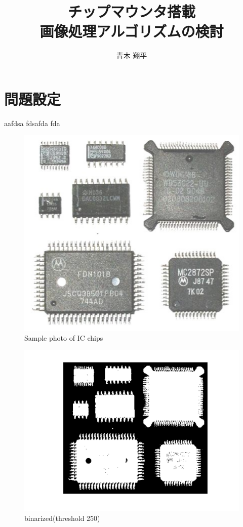 \documentclass[twocolumn,oneside,a4paper]{article}
\title{チップマウンタ搭載 \\画像処理アルゴリズムの検討}
\author{青木 翔平}
\begin{document}
\maketitle

\section{問題設定}
aafdsa
fdsafda
fda

\begin{figure}[htbp]
    \includegraphics[bb=0 0 427 389,width=1\columnwidth]{chip.png}
    \caption{Sample photo of IC chips}
    \label{fig:chip}
\end{figure}



\begin{figure}[htbp]
    \includegraphics[bb=0 0 576 432,width=1\columnwidth]{bw.png}
    \caption{binarized(threshold 250)}
    \label{fig:bw}
\end{figure}
\end{document}
